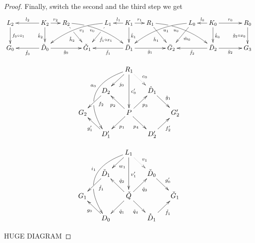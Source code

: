\documentclass[a4paper,UKenglish,cleveref,pdftex,thm-restate,numberwithinsect,anonymous]{lipics}
\def\G{\textbf {\textup{G}}}
\begin{document}
\begin{proof}
	
	Finally, switch the second and the third step we get
	\[\xymatrix@C=15pt{L_2\ar[d]^{f_0\circ z_1}&& K_2 \ar[d]_{\mathring{k}_2}\ar[ll]_{l_2} \ar[r]^{r_2} & R_2 \ar@/^.35cm/[drrr]_(.4){v_0}|(.285)\hole \ar[dr]|(.28)\hole_{\mathring{h}_2} && L_1 \ar@/_.35cm/[dlll]^(.4){v_1} \ar[dl]|(.28)\hole^{\mathring{f}_1 \circ x_1}& K_1 \ar[d]^{\mathring{k}_1}\ar[l]_{l_1} \ar[r]^{r_1} & R_1 \ar@/^.35cm/[drrr]_(.4){u_0}|(.285)\hole\ar[dr]_{\check{h}_1}   && L_0 \ar@/_.35cm/[dlll]^(.4){u_1} \ar[dl]^{\mathring{m}_0}& K_0 \ar[d]^{\mathring{k}_0}\ar[l]_{l_0} \ar[rr]^{r_0} && R_0\ar[d]_{\check{g}_2\circ x_0} \\G_0 && \ar[ll]^{\check{f}_0} \check{D}_0 \ar[rr]_{\check{g}_0}&& \check{G}_1  && \ar[ll]^{\bar{f}_1} \bar{D}_1 \ar[rr]_{\bar{g}_1}&& \bar{G}_2 && \ar[ll]^{\bar{f}_2} \bar{D}_2 \ar[rr]_{\bar{g}_2}&& G_3 }\]
	
	\[\xymatrix@R=15pt@C=15pt{&&R_1 \ar@/_1.2cm/[dddl]_(.4){a_0}|(.63)\hole\ar[dl]^{j_0}\ar[dd]^{c'_0} \ar@{.>}[dr]^{c_0}\\&D_2 \ar[dl]^(.4){f_2}&&\hat{D}_1 \ar[dr]^{\hat{g}_1}\\G_2 && P\ar[dr]_{p_4} \ar[ur]_{p_3}\ar[dl]^{p_1} \ar[ul]^{p_2}&&G'_2\\& D'_1 \ar[ul]^{g'_1}&&D'_2 \ar[ur]_{f'_2}}\]
	
	\[\xymatrix@R=15pt@C=15pt{&&L_1 \ar[dl]^{w_1} \ar@/_1.2cm/[dddl]_(.4){i_1}|(.63)\hole\ar[dd]^{v'_1} \ar@{.>}[dr]^{v_1}\\&\check{D}_1 \ar[dl]^(.4){\check{f}_1}&&\check{D}_0 \ar[dr]^{g'_0}\\G_1 && \check{Q}\ar[dr]_{\check{q}_4} \ar[ur]_{\check{q}_3}\ar[dl]^{\check{q}_1} \ar[ul]_{\check{q}_2}&&\check{G}_1\\& D_0 \ar[ul]^{g_0}&&\mathring{D}_1 \ar[ur]_{\check{f}_1}}\]
	
	
	
	
	HUGE DIAGRAM
	

\end{proof}
\end{document}
